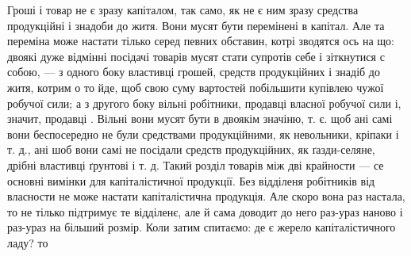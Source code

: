 Гроші і товар не є зразу капіталом, так само, як не
є ним зразу средства продукційні і знадоби до житя. Вони
мусят бути перемінені в капітал. Але та переміна може настати
тілько серед певних обставин, котрі зводятся ось на
що: двоякі дуже відмінні посідачі товарів мусят стати супротів
себе і зіткнутися с собою, — з одного боку властивці
грошей, средств продукційних і знадіб до житя, котрим
о то йде, щоб свою суму вартостей побільшити купівлею
чужої робучої сили; а з другого боку вільні робітники, продавці
власної робучої сили і, значит, продавці .
Вільні вони мусят бути в двоякім значіню, т. є. щоб ані
самі вони беспосередно не були средствами продукційними,
як невольники, кріпаки і т. д., ані шоб вони самі не посідали
средств продукційних, як ґазди-селяне, дрібні властивці
ґрунтові і т. д. Такий розділ товарів між дві крайности
— се основні вимінки для капіталістичної продукції.
Без відділеня робітників від власности не може настати
капіталістична продукція. Але скоро вона раз настала, то
не тілько підтримує те відділенє, але й сама доводит до
него раз-ураз наново і раз-ураз на більший розмір. Коли
затим спитаємо: де є жерело капіталістичного ладу? то
\parbreak{}
